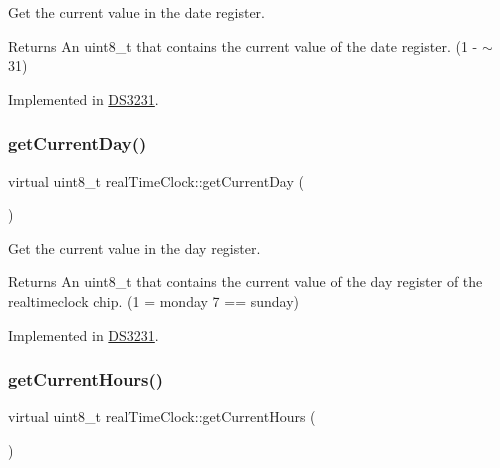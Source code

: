 Get the current value in the date register. 

\begin{DoxyReturn}{Returns}
An uint8\+\_\+t that contains the current value of the date register. (1 -\/ $\sim$31) 
\end{DoxyReturn}


Implemented in \mbox{\hyperlink{class_d_s3231_a346341a4d3c6615103b33fbff7a12884}{D\+S3231}}.

\mbox{\label{classreal_time_clock_a13b8ebc25275f183a1117402fc9e5e36}} 
\subsubsection{\texorpdfstring{get\+Current\+Day()}{getCurrentDay()}}
{\footnotesize\ttfamily virtual uint8\+\_\+t real\+Time\+Clock\+::get\+Current\+Day (\begin{DoxyParamCaption}{ }\end{DoxyParamCaption})\hspace{0.3cm}{\ttfamily [pure virtual]}}



Get the current value in the day register. 

\begin{DoxyReturn}{Returns}
An uint8\+\_\+t that contains the current value of the day register of the realtimeclock chip. (1 = monday 7 == sunday) 
\end{DoxyReturn}


Implemented in \mbox{\hyperlink{class_d_s3231_a813bbe55a08e1911d498511795721477}{D\+S3231}}.

\mbox{\label{classreal_time_clock_a2861a9bc75466a762b4cd8ce37193247}} 
\subsubsection{\texorpdfstring{get\+Current\+Hours()}{getCurrentHours()}}
{\footnotesize\ttfamily virtual uint8\+\_\+t real\+Time\+Clock\+::get\+Current\+Hours (\begin{DoxyParamCaption}{ }\end{DoxyParamCaption})\hspace{0.3cm}{\ttfamily [pure virtual]}}



